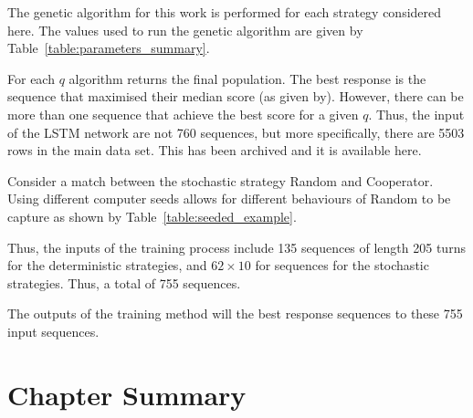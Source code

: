 \begin{figure}
    
\end{figure}

The genetic algorithm for this work is performed for each strategy considered here.
The values used to run the genetic algorithm are given by
Table~\ref{table:parameters_summary}.

\begin{table}[!htbp]
    \begin{center}
    \end{center}
    \caption{The parameters of the genetic algorithm.}\label{table:parameters_summary}
\end{table}

For each \(q\) algorithm returns the final population. The best response
is the sequence that maximised their median score (as given by). However,
there  can be more than one sequence that achieve the best score for a given \(q\).
Thus, the input of the LSTM network are not 760 sequences, but more specifically,
there are 5503 rows in the main data set. This has been archived and it
is available here.

Consider a match between the stochastic strategy Random and Cooperator.
Using different computer seeds allows for different behaviours of Random to
be capture as shown by Table~\ref{table:seeded_example}.


Thus, the inputs of the training process include 135 sequences of length 205
turns for the deterministic strategies, and \(62 \times 10\) for sequences
for the stochastic strategies. Thus, a total of 755 sequences.

The outputs of the training method will the best response sequences to these
755 input sequences.

\section{Chapter Summary}
